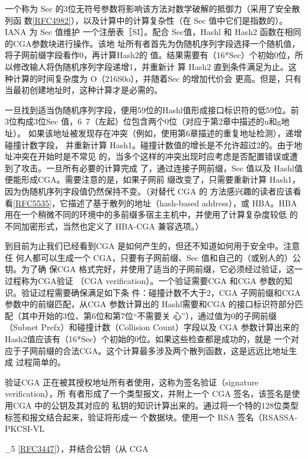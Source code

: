 一个称为 Sec 的3位无符号参数将影响该方法对数学破解的抵御力（采用了安全散列函
数\href{https://www.rfc-editor.org/rfc/rfc4982}{[RFC4982]}），以及计算中的计算复杂性（在 Sec 值中它们是指数的）。IANA 为 Sec 值维护
一个注册表［SI］。配合 Sec值，Hashl 和 Hash2 函数在相同的CGA参数块进行操作。该地
址所有者首先为伪随机序列字段选择一个随机值，将子网前缀字段看作0，再计算Hash2的
值。结果需要有（16*Sec）个初始0位，所以修改输人将伪随机序列字段递增1，并重新计
算 Hash2 直到条件满足为止。这种计算的时间复杂度为 O（216S0o），并随着Sec 的增加代价会
更高。但是，只有当最初创建地址时，这种计算才是必需的。

一旦找到适当伪随机序列字段，便用59位的Hashl值形成接口标识符的低59位。前
3位构成3位Sec 值，6~7（左起）位包含两个0位（对应于第2章中描述的u和g地址）。
如果该地址被发现存在冲突（例如，使用第6章描述的重复地址检测），递增碰撞计数字段，
并重新计算 Hash1。碰撞计数值的增长是不允许超过2的。由于地址冲突在开始时是不常见
的，当多个这样的冲突出现时应考虑是否配置错误或遭到了攻击。一旦所有必要的计算完成
了，通过连接子网前缀，Sec 值以及 Hashl值便能形成CGA。需要注意的是，如果子网前
缀改变了，只需要重新计算 Hash1，因为伪随机序列字段值仍然保持不变。（对替代 CGA 的
方法感兴趣的读者应该看看\href{https://www.rfc-editor.org/rfc/rfc5535}{[RFC5535]}，它描述了基于散列的地址（hash-based address），或
HBA。HBA 用在一个稍微不同的环境中的多前缀多宿主主机中，并使用了计算复杂度较低
的不同加密形式，当然也定义了 HBA-CGA 兼容选项。）

到目前为止我们已经看到CGA 是如何产生的，但还不知道如何用于安全中。注意任
何人都可以生成一个 CGA，只要有子网前缀、Sec 值和自己的（或别人的）公钥。为了确
保CGA 格式完好，并使用了适当的子网前缀，它必须经过验证，这一过程称为CGA验证
（CGA verification）。一个验证需要CGA 和CGA 参数的知识。验证过程需要确保满足如下条
件：碰撞计数不大于2，CGA 子网前缀和CGA 参数中的前缀匹配，从CGA 参数计算出的
Hashl需要和CGA 的接口标识符部分匹配（其中开始的3位、第6位和第7位“不需要关
心”），通过值为0的子网前缀（Subnet Prefx）和碰撞计数（Collision Count）字段以及 CGA
参数计算出来的 Hash2值应该有（16*Sec）个初始的0位。如果这些检查都是成功的，就是
一个对应于子网前缀的合法CGA。这个计算最多涉及两个散列函数，这是远远比地址生成
过程简单的。

验证CGA 正在被其授权地址所有者使用，这称为签名验证（signature verification），所
有者形成了一个类型报文，并附上一个 CGA 签名，该签名是使用CGA 中的公钥及其对应的
私钥的知识计算出来的。通过将一个特的128位类型标签和报文结合起来，验证将形成一
个数据块。使用一个 RSA 签名（RSASSA-PKCSI-VL

\_5 \href{https://www.rfc-editor.org/rfc/rfc3447}{[RFC3447]}），并结合公钥（从 CGA

